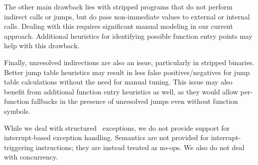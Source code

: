 The other main drawback lies with stripped programs that do not perform indirect calls or jumps, but do pass non-immediate values to external or internal calls.
Dealing with this requires significant manual modeling in our current approach.
Additional heuristics for identifying possible function entry points \autocite{bao2014byteweight,pe2020probabilistic}
may help with this drawback.

Finally, unresolved indirections are also an issue, particularly in stripped binaries.
Better jump table heuristics \autocite{cifuentes2001recovery,flexeder2010reconstruction,gedich2015switch,an2022dsv}
may result in less false positives/negatives for jump table calculations without the need for manual tuning.
This issue may also benefit from additional function entry heuristics as well,
as they would allow per-function fallbacks in the presence of unresolved jumps even without function symbols.

While we deal with structured \Cpp\ exceptions, we do not provide support for interrupt-based exception handling.
Semantics are not provided for interrupt-triggering instructions; they are instead treated as no-ops.
We also do not deal with concurrency.
